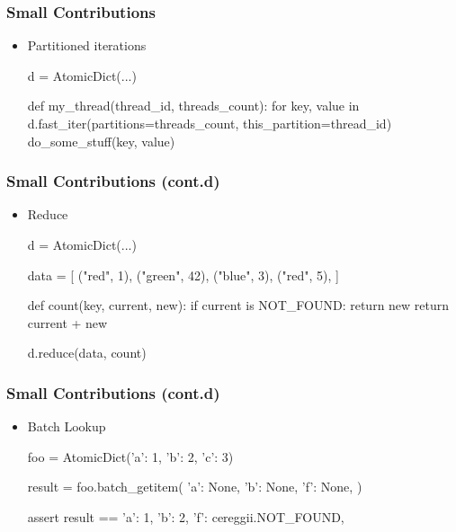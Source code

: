 \documentclass[aspectratio=169]{beamer}
\begin{document}
\begin{frame}[fragile]
    \frametitle{Small Contributions}

    \begin{itemize}
        \item Partitioned iterations
        \begin{tiny}
            \begin{python}
d = AtomicDict(...)

def my_thread(thread_id, threads_count):
    for key, value in d.fast_iter(partitions=threads_count, this_partition=thread_id)
        do_some_stuff(key, value)
            \end{python}
        \end{tiny}
    \end{itemize}
\end{frame}

\begin{frame}[fragile]
    \frametitle{Small Contributions (cont.d)}

    \begin{itemize}
        \item Reduce
        \begin{tiny}
            \begin{python}
d = AtomicDict(...)

data = [
    ("red", 1),
    ("green", 42),
    ("blue", 3),
    ("red", 5),
]

def count(key, current, new):
    if current is NOT_FOUND:
        return new
    return current + new

d.reduce(data, count)
            \end{python}
        \end{tiny}
    \end{itemize}
\end{frame}

\begin{frame}[fragile]
    \frametitle{Small Contributions (cont.d)}

    \begin{itemize}
        \item Batch Lookup
        \begin{tiny}
            \begin{python}
foo = AtomicDict({'a': 1, 'b': 2, 'c': 3})

result = foo.batch_getitem({
  'a': None,
  'b': None,
  'f': None,
})

assert result == {
  'a': 1,
  'b': 2,
  'f': cereggii.NOT_FOUND,
}
            \end{python}
        \end{tiny}
    \end{itemize}
\end{frame}
\end{document}
